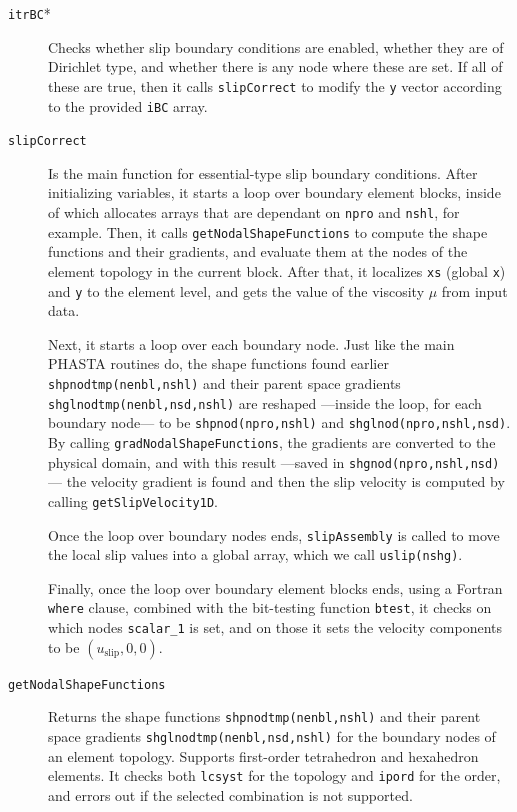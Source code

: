 \documentclass{ucb}
\begin{document}
\begin{description}

    \item[\texttt{itrBC}*] Checks whether slip boundary conditions are enabled, whether they are of Dirichlet type, and whether there is any node where these are set. If all of these are true, then it calls \texttt{slipCorrect} to modify the \texttt{y} vector according to the provided \texttt{iBC} array.
    
    \item[\texttt{slipCorrect}] Is the main function for essential-type slip boundary conditions. After initializing variables, it starts a loop over boundary element blocks, inside of which allocates arrays that are dependant on \texttt{npro} and \texttt{nshl}, for example. Then, it calls \texttt{getNodalShapeFunctions} to compute the shape functions and their gradients, and evaluate them at the nodes of the element topology in the current block. After that, it localizes \texttt{xs} (global \texttt{x}) and \texttt{y} to the element level, and gets the value of the viscosity $\mu$ from input data.
    
    Next, it starts a loop over each boundary node. Just like the main PHASTA routines do, the shape functions found earlier \texttt{shpnodtmp(nenbl,nshl)} and their parent space gradients \texttt{shglnodtmp(nenbl,nsd,nshl)} are reshaped ---inside the loop, for each boundary node--- to be \texttt{shpnod(npro,nshl)} and \texttt{shglnod(npro,nshl,nsd)}. \sloppy By calling \texttt{gradNodalShapeFunctions}, the gradients are converted to the physical domain, and with this result ---saved in \texttt{shgnod(npro,nshl,nsd)}--- the velocity gradient is found and then the slip velocity is computed by calling \texttt{getSlipVelocity1D}.
    
    Once the loop over boundary nodes ends, \texttt{slipAssembly} is called to move the local slip values into a global array, which we call \texttt{uslip(nshg)}.
    
    Finally, once the loop over boundary element blocks ends, using a Fortran \texttt{where} clause, combined with the bit-testing function \texttt{btest}, it checks on which nodes \texttt{scalar\_1} is set, and on those it sets the velocity components to be $\left(u_\mathrm{slip}, 0, 0\right)$.
    
    \item[\texttt{getNodalShapeFunctions}] Returns the shape functions \texttt{shpnodtmp(nenbl,nshl)} and their parent space gradients \texttt{shglnodtmp(nenbl,nsd,nshl)} for the boundary nodes of an element topology. Supports first-order tetrahedron and hexahedron elements. It checks both \texttt{lcsyst} for the topology and \texttt{ipord} for the order, and errors out if the selected combination is not supported.
    

\end{description}
\end{document}
